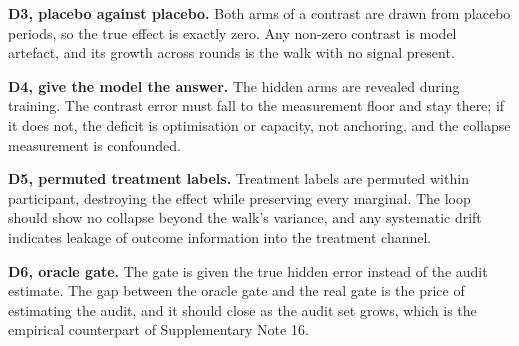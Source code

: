 \documentclass[11pt,a4paper]{article}
\begin{document}
\textbf{D3, placebo against placebo.} Both arms of a contrast are drawn from placebo periods, so the true effect is exactly zero. Any non-zero contrast is model artefact, and its growth across rounds is the walk with no signal present.

\textbf{D4, give the model the answer.} The hidden arms are revealed during training. The contrast error must fall to the measurement floor and stay there; if it does not, the deficit is optimisation or capacity, not anchoring, and the collapse measurement is confounded.

\textbf{D5, permuted treatment labels.} Treatment labels are permuted within participant, destroying the effect while preserving every marginal. The loop should show no collapse beyond the walk's variance, and any systematic drift indicates leakage of outcome information into the treatment channel.

\textbf{D6, oracle gate.} The gate is given the true hidden error instead of the audit estimate. The gap between the oracle gate and the real gate is the price of estimating the audit, and it should close as the audit set grows, which is the empirical counterpart of Supplementary Note 16.
\end{document}

